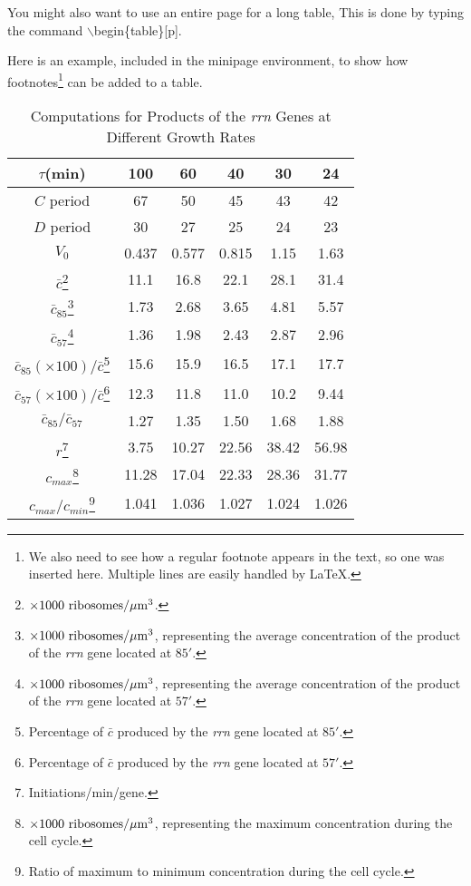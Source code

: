 You might also want to use an entire page for a long table,
This is done by typing the command $\backslash$begin\{table\}[p]. 

Here is an example, included in the minipage environment, to show how 
footnotes\footnote{We also need to see how a regular footnote
appears in the text, so one was inserted here. Multiple lines are easily
handled by \LaTeX.}
can be added to a table.
\begin{table}[bh]
\centering
\begin{minipage}{3.7in}
\caption{Computations for Products of the {\em rrn} Genes at Different
Growth Rates\label{tab2}}
\begin{tabular}{|c||c|c|c|c|c||}	 \hline
 $\tau$(min)  &  100  &	60 & 40 & 30 & 24 \\ \hline \hline
 $C$ period & 67 & 50  & 45 & 43 & 42 \\ \hline
 $D$ period & 30 & 27  & 25 & 24 & 23 \\ \hline
 $V_0$ & 0.437 & 0.577 & 0.815 & 1.15 & 1.63 \\ \hline
 $\bar c$\footnote{$\times 1000\ {\rm ribosomes}/\mu{\rm m}^3$.}
 & 11.1 & 16.8 & 22.1 & 28.1 & 31.4 \\ \hline
$\bar c_{85}$\footnote{$\times 1000\ {\rm ribosomes}/\mu{\rm m}^3$,
representing the average concentration of the product of the {\em rrn} gene
located at $85'$.} & 1.73 & 2.68 & 3.65 & 4.81 & 5.57 \\ \hline
$\bar c_{57}$\footnote{$\times 1000\ {\rm ribosomes}/\mu{\rm m}^3$,
representing the average concentration of the product of the {\em rrn} gene
located at $57'$.} & 1.36 & 1.98 & 2.43 & 2.87 & 2.96 \\ \hline
$\bar c_{85}({\scriptstyle\times 100})/\bar c$\footnote{Percentage of
$\bar c$ produced by the {\em rrn} gene located at $85'$.} & 15.6 & 15.9 &
16.5 & 17.1 & 17.7 \\ \hline
$\bar c_{57}({\scriptstyle\times 100})/\bar c$\footnote{Percentage of
$\bar c$ produced by the {\em rrn} gene located at $57'$.} & 12.3 & 11.8 &
11.0 & 10.2 & 9.44 \\ \hline
$\bar c_{85}/\bar c_{57}$ & 1.27 & 1.35 & 1.50 & 1.68 & 1.88 \\ \hline
 $r$\footnote{Initiations/min/gene.} & 3.75 & 10.27
  & 22.56 & 38.42 & 56.98 \\ \hline
$c_{max}$\footnote{$\times 1000\ {\rm ribosomes}/\mu{\rm m}^3$, representing
the maximum concentration during the cell cycle.} & 11.28 & 17.04
  & 22.33 & 28.36 & 31.77 \\ \hline
$c_{max}/c_{min}$\footnote{Ratio of maximum to minimum concentration
 during the cell cycle.} & 1.041 & 1.036 & 1.027 & 1.024 & 1.026 \\ \hline
\end{tabular}
\end{minipage}
\end{table}

